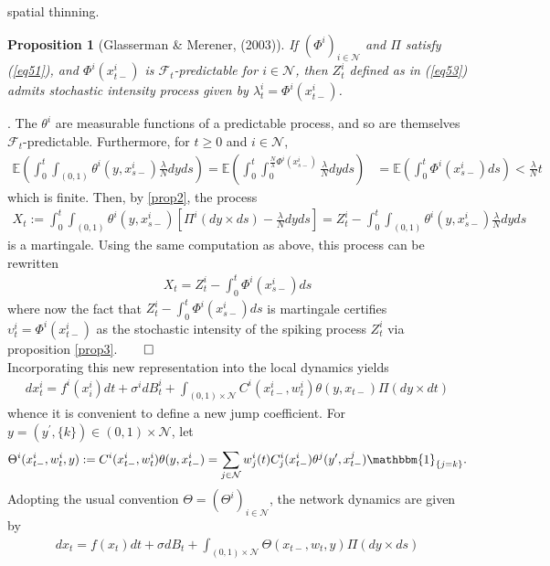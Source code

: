 \documentclass[12pt, oneside]{report}
\newcommand{\E}{\mathbb{E}}
\newcommand{\1}[1]{\mathbbm{1}_{\{#1\}}}
\newcommand{\mc}[1]{\mathcal{#1}}
\newtheorem{proposition}[theorem]{Proposition}
\theoremstyle{definition}
\begin{document}
spatial thinning.
\begin{proposition}[Glasserman \& Merener, (2003)]\label{prop4}
    If $(\Phi^i)_{i\in\mc{N}}$ and $\Pi$ satisfy (\ref{eq51}), and
    $\Phi^i(x^i_{t-})$ is $\mc{F}_t$-predictable for $i\in\mc{N}$, then $Z^i_t$
    defined as in (\ref{eq53}) admits stochastic intensity process given by
    $\lambda^i_t=\Phi^i(x^i_{t-})$.
\end{proposition}
. The $\theta^i$ are measurable functions of a predictable
process, and so are themselves $\mc{F}_t$-predictable. Furthermore, for $t\geq
0$ and $i\in\mc{N}$, 
\begin{align*}
    \E\left(\int_0^t\int_{(0,1)}\theta^i(y,x^i_{s-})\frac{\lambda}{N}dyds\right)=\E\left(\int_0^t\int_0^{\frac{N}{\lambda}\Phi^i(x^i_{s-})}\frac{\lambda}{N}dyds\right)&=\E\left(\int_0^t\Phi^i(x^i_{s-})ds\right)
    <\frac{\lambda}{N}t
\end{align*}
which is finite. Then, by \ref{prop2}, the process
\begin{align*}
    X_t:=\int_0^t\int_{(0,1)}\theta^i(y,x^i_{s-})\left[\Pi^i(dy\times ds)-\frac{\lambda}{N}dyds\right]=Z^i_t-\int_0^t\int_{(0,1)}\theta^i(y,x^i_{s-})\frac{\lambda}{N}dyds
\end{align*}
is a martingale. Using the same computation as above, this process can be
rewritten
\begin{align*}
    X_t=Z^i_t-\int_0^t\Phi^i(x^i_{s-})ds
\end{align*}
where now the fact that $Z^i_t-\int_0^t\Phi^i(x^i_{s-})ds$ is martingale
certifies $\upsilon^i_t=\Phi^i(x^i_{t-})$ as the stochastic intensity of the
spiking process $Z^i_t$ via proposition \ref{prop3}.\hfill{$\qed$}\\[5pt]
\indent Incorporating this new representation into the local dynamics yields
\begin{align}
    dx^i_t=f^i(x^i_i)dt+\sigma^idB^i_t+\int_{(0,1)\times\mc{N}}C^i(x^i_{t-},w^i_t)\theta(y,x_{t-})\Pi(dy\times dt)
\end{align}
whence it is convenient to define a new jump coefficient. For
$y=(y^\prime,\{k\})\in (0,1)\times\mc{N}$, let
\begin{align}
    \Theta^i(x^i_{t-},w^i_t,y):=C^i(x^i_{t-},w^i_t)\theta(y,x^i_{t-})=\sum_{j\in\mc{N}}w^i_j(t)C^i_j(x^i_{t-})\theta^j(y^\prime,x^j_{t-})\1{j=k}.\label{eq54}
\end{align}
Adopting the usual convention $\Theta=(\Theta^i)_{i\in\mc{N}}$, the network
dynamics are given by
\begin{align}
    dx_t=f(x_t)dt+\sigma dB_t+\int_{(0,1)\times\mc{N}}\Theta(x_{t-},w_{t},y)\Pi(dy\times ds)\label{eq55}
\end{align}
\end{document}
